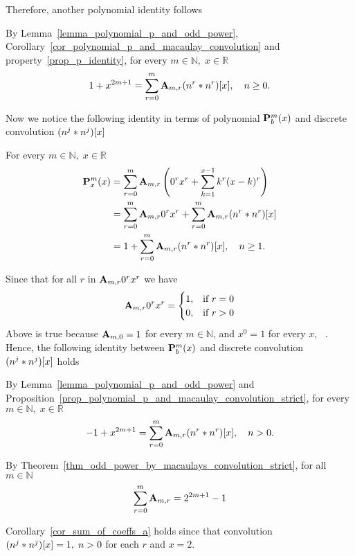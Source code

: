 Therefore, another polynomial identity follows
\begin{thm}
    \label{thm_odd_power_by_macaulays_convolution}
    By Lemma~\ref{lemma_polynomial_p_and_odd_power}, Corollary~\ref{cor_polynomial_p_and_macaulay_convolution}
    and property~\ref{prop_p_identity}, for every $m\in\mathbb{N}, \; x\in\mathbb{R}$
    \begin{equation*}
        1 + x^{2m+1} = \sum_{r=0}^{m} {\mathbf{A}} \sb{m,r} (n \sp{r} \ast n \sp{r}) [x], \quad n\geq 0.
    \end{equation*}
\end{thm}
Now we notice the following identity in terms of polynomial ${\mathbf{P}}\sp{m} \sb{b}(x)$ and
discrete convolution $(n \sp{j} \ast n \sp{j}) [x]$
\begin{prop}
    \label{prop_polynomial_p_and_macaulay_convolution_strict}
    For every $m \in \mathbb{N}, \; x\in\mathbb{R}$
    \begin{equation*}
        \begin{split}
            {\mathbf{P}}\sp{m} \sb{x}(x)
            &=\sum_{r=0}^{m} {\mathbf{A}} \sb{m,r} \left(0^r x^r + \sum_{k=1}^{x-1} k^r (x-k)^r \right) \\
            &=\sum_{r=0}^{m} {\mathbf{A}} \sb{m,r} 0^r x^r + \sum_{r=0}^{m} {\mathbf{A}} \sb{m,r} (n \sp{r} \ast n \sp{r}) [x] \\
            &=1 + \sum_{r=0}^{m} {\mathbf{A}} \sb{m,r} (n \sp{r} \ast n \sp{r}) [x], \quad n\geq 1.
        \end{split}
    \end{equation*}
\end{prop}
Since that for all $r$ in ${\mathbf{A}} \sb{m,r} 0^r x^r$ we have
\begin{equation*}
    {\mathbf{A}} \sb{m,r} 0^r x^r =
    \begin{cases}
        1, & \mbox{if } r=0 \\
        0, & \mbox{if } r>0
    \end{cases}
\end{equation*}
Above is true because ${\mathbf{A}} \sb{m,0}=1$ for every $m\in\mathbb{N}$, and $x^0 = 1$
for every $x$, ~\cite{graham1994concrete}.
Hence, the following identity between ${\mathbf{P}}\sp{m} \sb{b}(x)$ and
discrete convolution $(n \sp{j} \ast n \sp{j}) [x]$ holds
\begin{thm}
    \label{thm_odd_power_by_macaulays_convolution_strict}
    By Lemma~\ref{lemma_polynomial_p_and_odd_power} and
    Proposition~\ref{prop_polynomial_p_and_macaulay_convolution_strict},
    for every $m\in\mathbb{N}, \; x\in\mathbb{R}$
    \begin{equation*}
        -1 + x^{2m+1} = \sum_{r=0}^{m} {\mathbf{A}} \sb{m,r} (n \sp{r} \ast n \sp{r}) [x], \quad n > 0.
    \end{equation*}
\end{thm}
\begin{cor}
    \label{cor_sum_of_coeffs_a}
    By Theorem~\ref{thm_odd_power_by_macaulays_convolution_strict}, for all $m\in\mathbb{N}$
    \begin{equation*}
        \sum_{r=0}^{m} {\mathbf{A}} \sb{m,r} = 2^{2m+1} - 1
    \end{equation*}
\end{cor}
Corollary~\ref{cor_sum_of_coeffs_a} holds since that convolution $(n \sp{j} \ast n \sp{j}) [x]=1, \; n > 0$
for each $r$ and $x=2$.
